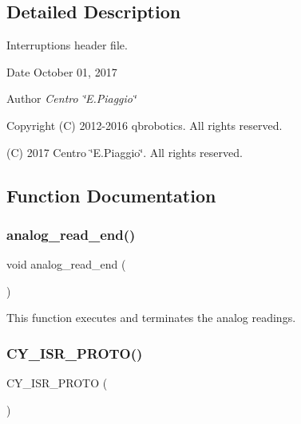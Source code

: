 \subsection{Detailed Description}
Interruptions header file. 

\begin{DoxyDate}{Date}
October 01, 2017 
\end{DoxyDate}
\begin{DoxyAuthor}{Author}
{\itshape Centro \char`\"{}\+E.\+Piaggio\char`\"{}} 
\end{DoxyAuthor}
\begin{DoxyCopyright}{Copyright}
(C) 2012-\/2016 qbrobotics. All rights reserved. 

(C) 2017 Centro \char`\"{}\+E.\+Piaggio\char`\"{}. All rights reserved. 
\end{DoxyCopyright}


\subsection{Function Documentation}
\mbox{\label{interruptions_8h_a00a8d34962a63161405e5d7785b9625e}} 
\subsubsection{analog\+\_\+read\+\_\+end()}
{\footnotesize\ttfamily void analog\+\_\+read\+\_\+end (\begin{DoxyParamCaption}{ }\end{DoxyParamCaption})}

This function executes and terminates the analog readings. \mbox{\label{interruptions_8h_a7e24af8c83537b0441877bf0f00dd30a}} 
\subsubsection{C\+Y\+\_\+\+I\+S\+R\+\_\+\+P\+R\+O\+T\+O()\hspace{0.1cm}{\footnotesize\ttfamily [1/2]}}
{\footnotesize\ttfamily C\+Y\+\_\+\+I\+S\+R\+\_\+\+P\+R\+O\+TO (\begin{DoxyParamCaption}\item[{I\+S\+R\+\_\+\+R\+S485\+\_\+\+R\+X\+\_\+\+Ex\+Interrupt}]{ }\end{DoxyParamCaption})}

